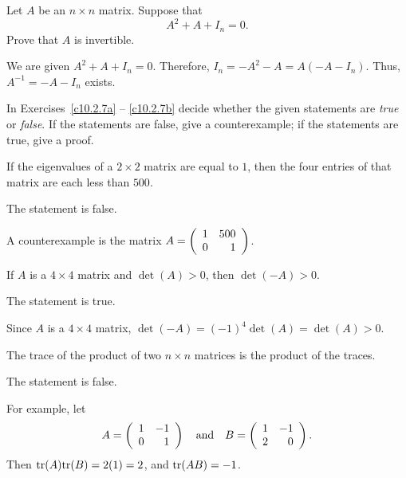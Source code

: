 \documentclass{ximera}
\begin{document}
\begin{exercise} \label{c10.2.6}
Let $A$ be an $n\times n$ matrix.  Suppose that 
\[
A^2 + A + I_n = 0.
\]
Prove that $A$ is invertible.

\begin{solution}

We are given $A^2 + A + I_n = 0$.  Therefore, $I_n = -A^2 - A =
A(-A - I_n)$.  Thus, $A^{-1} = -A - I_n$ exists.

\end{solution}
\end{exercise}

\noindent In Exercises~\ref{c10.2.7a} -- \ref{c10.2.7b} decide whether 
the given statements are {\em true\/} or {\em false\/}. If the 
statements are false, give a counterexample; if the statements are true, 
give a proof.
\begin{exercise} \label{c10.2.7a}
If the eigenvalues of a $2\times 2$ matrix are equal to $1$,
then the four entries of that matrix are each less than $500$.

\begin{solution}

\ans The statement is false. 

\soln  A counterexample is the matrix $A = \left(\begin{array}{rr} 1 & 500\\ 0 &1\end{array}\right)$.

\end{solution}
\end{exercise}

\begin{exercise} \label{c10.2.7ab}
If $A$ is a $4\times 4$ matrix and $\det(A)>0$, then $\det(-A)>0$. 

\begin{solution}
\ans The statement is true.

\soln Since $A$ is a $4\times 4$ matrix, $\det(-A) = (-1)^4\det(A)=\det(A)>0$. 
\end{solution}
\end{exercise}

\begin{exercise} \label{c10.2.7b}
The trace of the product of two $n\times n$ matrices is the
product of the traces.

\begin{solution}
\ans The statement is false.

\soln For example, let
\[
A = \left(\begin{array}{rr} 1 & -1\\ 0 &1\end{array}\right) \quad\mbox{and}\quad B = \left(\begin{array}{rr} 1 & -1\\ 2 &0\end{array}\right).
\]
Then ${\rm tr}(A){\rm tr}(B) = 2(1) = 2$, and ${\rm tr}(AB) = -1$.

\end{solution}
\end{exercise}
\end{document}
